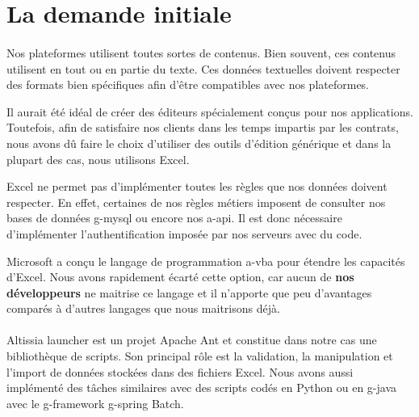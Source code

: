 \section{La demande initiale}
\label{sec:initial-request}

\paragraph{}
Nos plateformes utilisent toutes sortes de contenus.
Bien souvent, ces contenus utilisent en tout ou en partie du texte.
Ces données textuelles doivent respecter des formats bien spécifiques afin d'être compatibles avec nos plateformes.

Il aurait été idéal de créer des éditeurs spécialement conçus pour nos applications.
Toutefois, afin de satisfaire nos clients dans les temps impartis par les contrats, nous avons dû faire le choix d'utiliser des outils d'édition générique et dans la plupart des cas, nous utilisons Excel.

Excel ne permet pas d'implémenter toutes les règles que nos données doivent respecter.
En effet, certaines de nos règles métiers imposent de consulter nos bases de données \gls{g-mysql} ou encore nos \gls{a-api}.
Il est donc nécessaire d'implémenter l'authentification imposée par nos serveurs avec du code.

Microsoft a conçu le langage de programmation \gls{a-vba} pour étendre les capacités d'Excel\cite{o365devx_pris_nodate}.
Nous avons rapidement écarté cette option, car aucun de \textbf{nos développeurs} ne maitrise ce langage et il n'apporte que peu d'avantages comparés à d'autres langages que nous maitrisons déjà.

\paragraph{}
Altissia launcher est un projet Apache Ant\fnmark{} et constitue dans notre cas une bibliothèque de scripts.
Son principal rôle est la validation, la manipulation et l'import de données stockées dans des fichiers Excel.
Nous avons aussi implémenté des tâches similaires avec des scripts codés en Python\fnmark{} ou en \gls{g-java} avec le \gls{g-framework} \Gls{g-spring} Batch\fnmark{}.


